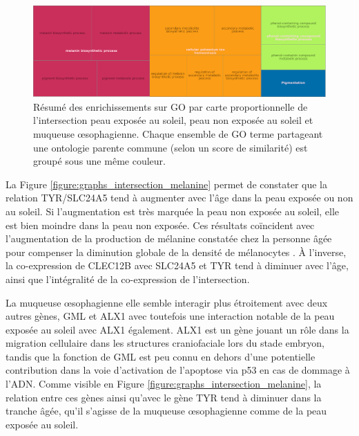 \begin{figure}[hb]
    \centering
    \includegraphics[width=1\textwidth]{img/chap2/chap2_revigo_resume_enrich_skin.pdf}
    \caption[Résumé des enrichissements sur GO par carte proportionnelle de l'intersection peau exposée au soleil, peau non exposée au soleil et muqueuse œsophagienne]{Résumé des enrichissements sur GO par carte proportionnelle de l'intersection peau exposée au soleil, peau non exposée au soleil et muqueuse œsophagienne. Chaque ensemble de GO terme partageant une ontologie parente commune (selon un score de similarité) est groupé sous une même couleur.}
    \label{figure:revigo_resume_melanine}
\end{figure}

La Figure \ref{figure:graphs_intersection_melanine} permet de constater que la relation TYR/SLC24A5 tend à augmenter avec l'âge dans la peau exposée ou non au soleil. Si l'augmentation est très marquée la peau non exposée au soleil, elle est bien moindre dans la peau non exposée. Ces résultats coïncident avec l'augmentation de la production de mélanine constatée chez la personne âgée pour compenser la diminution globale de la densité de mélanocytes . À l'inverse, la co-expression de CLEC12B avec SLC24A5 et TYR tend à diminuer avec l'âge, ainsi que l'intégralité de la co-expression de l'intersection.

La muqueuse œsophagienne elle semble interagir plus étroitement avec deux autres gènes, GML et ALX1 avec toutefois une interaction notable de la peau exposée au soleil avec ALX1 également. ALX1 est un gène jouant un rôle dans la migration cellulaire dans les structures craniofaciale lors du stade embryon, tandis que la fonction de GML est peu connu en dehors d'une potentielle contribution dans la voie d'activation de l'apoptose via p53 en cas de dommage à l'ADN. Comme visible en Figure \ref{figure:graphs_intersection_melanine}, la relation entre ces gènes ainsi qu'avec le gène TYR tend à diminuer dans la tranche âgée, qu'il s'agisse de la muqueuse œsophagienne comme de la peau exposée au soleil.




